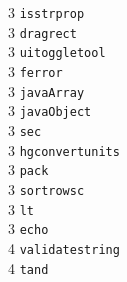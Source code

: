 \begin{footnotesize}
\begin{multicols}{3}
\vspace{-.153cm} 3     \hspace{.2cm} {\tt isstrprop           }   \\ %
\vspace{-.153cm} 3     \hspace{.2cm} {\tt dragrect            }   \\ %
\vspace{-.153cm} 3     \hspace{.2cm} {\tt uitoggletool        }   \\ %
\vspace{-.153cm} 3     \hspace{.2cm} {\tt ferror              }   \\ %
\vspace{-.153cm} 3     \hspace{.2cm} {\tt javaArray           }   \\ %
\vspace{-.153cm} 3     \hspace{.2cm} {\tt javaObject          }   \\ %
\vspace{-.153cm} 3     \hspace{.2cm} {\tt sec                 }   \\ %
\vspace{-.153cm} 3     \hspace{.2cm} {\tt hgconvertunits      }   \\ %
\vspace{-.153cm} 3     \hspace{.2cm} {\tt pack                }   \\ %
\vspace{-.153cm} 3     \hspace{.2cm} {\tt sortrowsc           }   \\ %
\vspace{-.153cm} 3     \hspace{.2cm} {\tt lt                  }   \\ %
\vspace{-.153cm} 3     \hspace{.2cm} {\tt echo                }   \\ %
\vspace{-.153cm} 4     \hspace{.2cm} {\tt validatestring      }   \\ %
\vspace{-.153cm} 4     \hspace{.2cm} {\tt tand                }   \\ %

\end{multicols}
\end{footnotesize}
